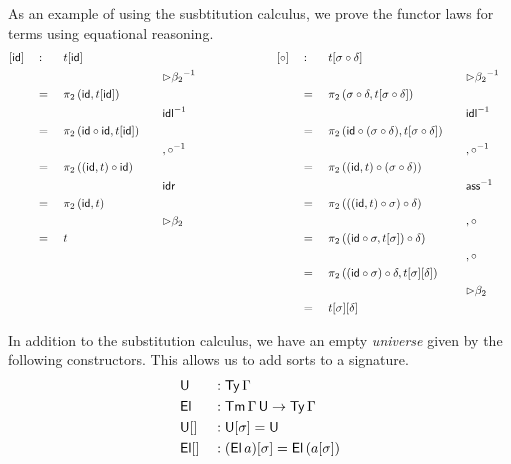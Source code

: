 \documentclass[acmsmall,review,anonymous]{acmart}\settopmatter{printfolios=true,printccs=false,printacmref=false}
\begin{document}
As an example of using the susbtitution calculus, we prove the functor
laws for terms using equational reasoning.
\begin{alignat*}{15}
  & [\id] && : && t[\id] &&                      && && \hspace{6em} [\circ] && : && t[\sigma\circ\delta] \\
  & && && && && {\rhd\beta_2}^{-1}                && && && && && {\rhd\beta_2}^{-1} \\
  & && = \,\, && \pi_2\,(\id, t[\id]) &&         && && && = \,\, && \pi_2\,(\sigma\circ\delta, t[\sigma\circ\delta]) \\
  & && && && && {\idl}^{-1}                       && && && && && {\idl}^{-1} \\
  & && = \,\, && \pi_2\,(\id\circ\id, t[\id])    && && && && = \,\, && \pi_2\,(\id\circ(\sigma\circ\delta), t[\sigma\circ\delta]) \\
  & && && && && {,\circ}^{-1}                    && && && && && {,\circ}^{-1} \\
  & && = \,\, && \pi_2\,((\id, t)\circ\id) &&    && && && = \,\, && \pi_2\,((\id, t)\circ(\sigma\circ\delta)) \\
  & && && && && \idr                             && && && && && \ass^{-1} \\
  & && = \,\, && \pi_2\,(\id, t) &&              && && && = \,\, && \pi_2\,(((\id, t)\circ\sigma)\circ\delta) \\
  & && && && && {\rhd\beta_2}                    && && && && && {,\circ} \\
  & && = \,\, && t &&                            && && && = \,\, && \pi_2\,((\id\circ\sigma, t[\sigma])\circ\delta) \\
  & && && &&                                     && && && && && && {,\circ} \\
  & && && &&                                     && && && = \,\, && \pi_2\,((\id\circ\sigma)\circ\delta, t[\sigma][\delta]) \\
  & && && &&                                     && && && && && && {\rhd\beta_2} \\
  & && && &&                                     && && && = \,\, && t[\sigma][\delta]
\end{alignat*}

In addition to the substitution calculus, we have an empty {\em
  universe} given by the following constructors. This allows us to add
sorts to a signature.
\begin{alignat*}{5}
  & \mathsf{U} && : \mathsf{Ty}\,\Gamma \\
  & \mathsf{El} && : \mathsf{Tm}\,\Gamma\,\mathsf{U} \rightarrow \mathsf{Ty}\,\Gamma \\
  & {\mathsf{U}[]} && : \mathsf{U}[\sigma] = \mathsf{U} \\
  & {\mathsf{El}[]} && : (\mathsf{El}\,a)[\sigma] = \mathsf{El}\,(a[\sigma])
\end{alignat*}
\end{document}
